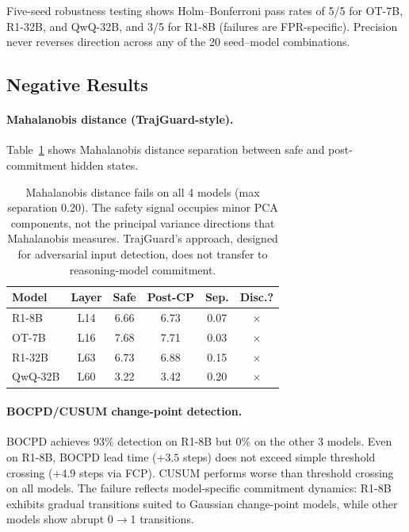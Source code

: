 \documentclass[11pt,a4paper]{article}
\newcommand{\xmark}{$\times$}
\begin{document}
Five-seed robustness testing shows Holm--Bonferroni pass rates of 5/5 for OT-7B, R1-32B, and QwQ-32B, and 3/5 for R1-8B (failures are FPR-specific).
Precision never reverses direction across any of the 20 seed--model combinations.

\subsection{Negative Results}
\label{sec:negative}

\paragraph{Mahalanobis distance (TrajGuard-style).}
Table~\ref{tab:mahal} shows Mahalanobis distance separation between safe and post-commitment hidden states.

\begin{table}[t]
\centering
\small
\begin{tabular}{lccccc}
\toprule
\textbf{Model} & \textbf{Layer} & \textbf{Safe} & \textbf{Post-CP} & \textbf{Sep.} & \textbf{Disc.?} \\
\midrule
R1-8B & L14 & 6.66 & 6.73 & 0.07 & \xmark \\
OT-7B & L16 & 7.68 & 7.71 & 0.03 & \xmark \\
R1-32B & L63 & 6.73 & 6.88 & 0.15 & \xmark \\
QwQ-32B & L60 & 3.22 & 3.42 & 0.20 & \xmark \\
\bottomrule
\end{tabular}
\caption{Mahalanobis distance fails on all 4 models (max separation 0.20). The safety signal occupies minor PCA components, not the principal variance directions that Mahalanobis measures. TrajGuard's approach, designed for adversarial input detection, does not transfer to reasoning-model commitment.}
\label{tab:mahal}
\end{table}

\paragraph{BOCPD/CUSUM change-point detection.}
BOCPD achieves 93\% detection on R1-8B but 0\% on the other 3 models.
Even on R1-8B, BOCPD lead time ($+3.5$ steps) does not exceed simple threshold crossing ($+4.9$ steps via FCP).
CUSUM performs worse than threshold crossing on all models.
The failure reflects model-specific commitment dynamics: R1-8B exhibits gradual transitions suited to Gaussian change-point models, while other models show abrupt 0$\to$1 transitions.
\end{document}
